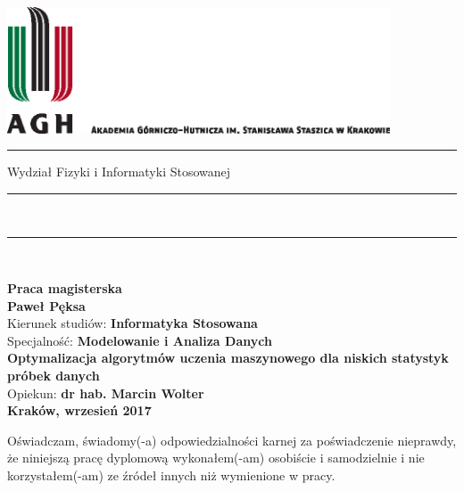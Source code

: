 
\thispagestyle{empty}
\includegraphics[height=37.5mm]{res/agh.eps}\\
\rule{30mm}{0pt}
{\large \textsf{Wydział Fizyki i Informatyki Stosowanej}}\\
\rule{\textwidth}{3pt}\\
\rule[2ex]
{\textwidth}{1pt}\\
\vspace{7ex}
\begin{center}
{\LARGE \bf \textsf{Praca magisterska}}\\
\vspace{13ex}
{\bf \Large \textsf{Paweł Pęksa}}\\
\vspace{3ex}
{\sf\small Kierunek studiów:} {\bf\small \textsf{Informatyka Stosowana}}\\
\vspace{1.5ex}
{\sf\small Specjalność:} {\bf\small \textsf{Modelowanie i Analiza Danych}}\\
\vspace{10ex}
{\bf \huge \textsf{Optymalizacja algorytmów uczenia maszynowego dla niskich statystyk próbek danych}}\\
\vspace{14ex}
{\Large Opiekun: \bf \textsf{dr hab. Marcin Wolter}}\\
\vspace{22ex}
{\large \bf \textsf{Kraków, wrzesień 2017}}
\end{center}

\newpage

{\sf Oświadczam, świadomy(-a) odpowiedzialności karnej za poświadczenie nieprawdy, że niniejszą pracę dyplomową wykonałem(-am) osobiście i samodzielnie i  nie korzystałem(-am) ze źródeł innych niż wymienione w pracy.}

